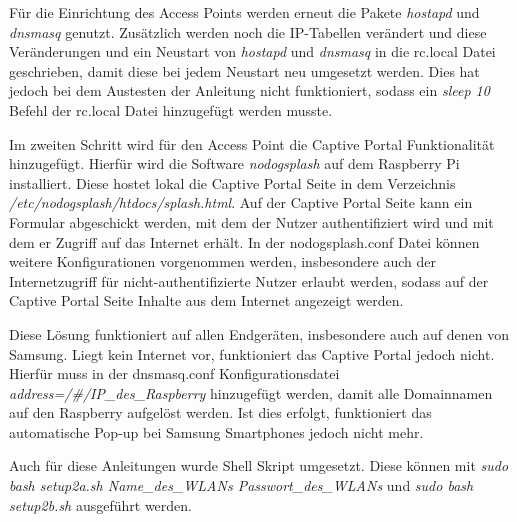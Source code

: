 Für die Einrichtung des Access Points werden erneut die Pakete \textit{hostapd} und \textit{dnsmasq} genutzt. Zusätzlich werden noch die IP-Tabellen verändert und diese Veränderungen und ein Neustart von \textit{hostapd} und \textit{dnsmasq} in die rc.local Datei geschrieben, damit diese bei jedem Neustart neu umgesetzt werden. Dies hat jedoch bei dem Austesten der Anleitung nicht funktioniert, sodass ein \textit{sleep 10} Befehl der rc.local Datei hinzugefügt werden musste.

Im zweiten Schritt wird für den Access Point die Captive Portal Funktionalität hinzugefügt. Hierfür wird die Software \textit{nodogsplash} auf dem Raspberry Pi installiert. Diese hostet lokal die Captive Portal Seite in dem Verzeichnis \textit{/etc/nodogsplash/htdocs/splash.html}. Auf der Captive Portal Seite kann ein Formular abgeschickt werden, mit dem der Nutzer authentifiziert wird und mit dem er Zugriff auf das Internet erhält. In der nodogsplash.conf Datei können weitere Konfigurationen vorgenommen werden, insbesondere auch der Internetzugriff für nicht-authentifizierte Nutzer erlaubt werden, sodass auf der Captive Portal Seite Inhalte aus dem Internet angezeigt werden.

Diese Lösung funktioniert auf allen Endgeräten, insbesondere auch auf denen von Samsung. Liegt kein Internet vor, funktioniert das Captive Portal jedoch nicht. Hierfür muss in der dnsmasq.conf Konfigurationsdatei \textit{address=/\#/IP\_des\_Raspberry} hinzugefügt werden, damit alle Domainnamen auf den Raspberry aufgelöst werden. Ist dies erfolgt, funktioniert das automatische Pop-up bei Samsung Smartphones jedoch nicht mehr.

Auch für diese Anleitungen wurde Shell Skript umgesetzt. Diese können mit \textit{sudo bash setup2a.sh Name\_des\_WLANs Passwort\_des\_WLANs} und \textit{sudo bash setup2b.sh} ausgeführt werden.

